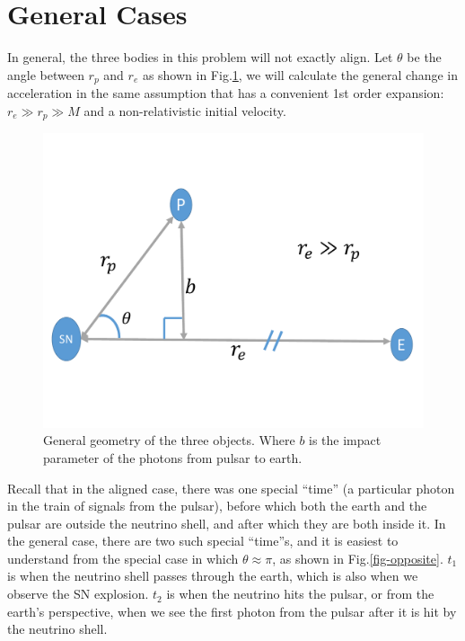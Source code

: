 \documentclass[aps,showpacs,twocolumn,floats,prd,superscriptaddress,nofootinbib]{revtex4}
\begin{document}
\section{General Cases}
\label{sec-3d}

In general, the three bodies in this problem will not exactly align. Let $\theta$ be the angle between $r_p$ and $r_e$ as shown in Fig.\ref{fig:3}, we will calculate the general change in acceleration in the same assumption that has a convenient 1st order expansion: $r_e\gg r_p\gg M$ and a non-relativistic initial velocity.

\begin{figure}[t]
\begin{center}
\includegraphics[scale = 0.3]{Image4.pdf}
\vspace{-8 mm}\caption{General geometry of the three objects. Where $b$ is the impact parameter of the photons from pulsar to earth. } 
\label{fig:3}
\end{center}
\end{figure}

Recall that in the aligned case, there was one special ``time'' (a particular photon in the train of signals from the pulsar), before which both the earth and the pulsar are outside the neutrino shell, and after which they are both inside it. In the general case, there are two such special ``time''s, and it is easiest to understand from the special case in which $\theta \approx \pi$, as shown in Fig.\ref{fig-opposite}. $t_1$ is when the neutrino shell passes through the earth, which is also when we observe the SN explosion.  $t_2$ is when the neutrino hits the pulsar, or from the earth's perspective, when we see the first photon from the pulsar after it is hit by the neutrino shell.
\end{document}
